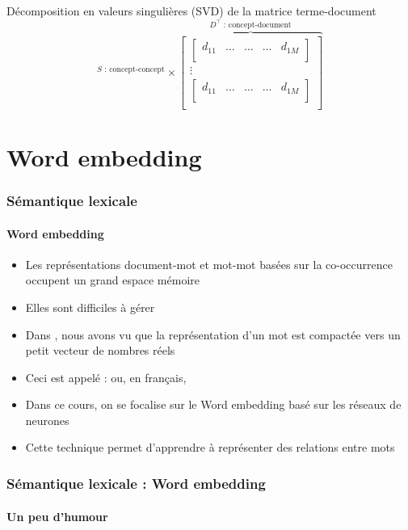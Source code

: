 \documentclass[xcolor=table]{beamer}
\begin{document}
\begin{frame}
\begin{block}{Décomposition en valeurs singulières (SVD) de la matrice terme-document}
\[{		}^{S \text{ : concept-concept}}
		\times 
		\overbrace{
			\begin{bmatrix}
			\begin{bmatrix}
			d_{11} & \ldots & \ldots & \ldots & d_{1M} \\
			\end{bmatrix}\\
			\vdots \\
			\begin{bmatrix}
			d_{11} & \ldots & \ldots & \ldots & d_{1M} \\
			\end{bmatrix}\\
			\end{bmatrix}
		}^{D^\top \text{ : concept-document}}
		\]
		
	\end{block}
	
\end{frame}


\section{Word embedding}

\begin{frame}
\frametitle{Sémantique lexicale}
\framesubtitle{Word embedding}

\begin{itemize}
	\item Les représentations document-mot et mot-mot basées sur la co-occurrence occupent un grand espace mémoire 
	\item Elles sont difficiles à gérer 
	\item Dans , nous avons vu que la représentation d'un mot est compactée vers un petit vecteur de nombres réels
	\item Ceci est appelé :  ou, en français, 
	\item Dans ce cours, on se focalise sur le Word embedding basé sur les réseaux de neurones
	\item Cette technique permet d'apprendre à représenter des relations entre mots
\end{itemize}

\end{frame}


\begin{frame}
\frametitle{Sémantique lexicale : Word embedding}
\framesubtitle{Un peu d'humour}
\begin{center}
\end{center}
\end{frame}
\end{document}
